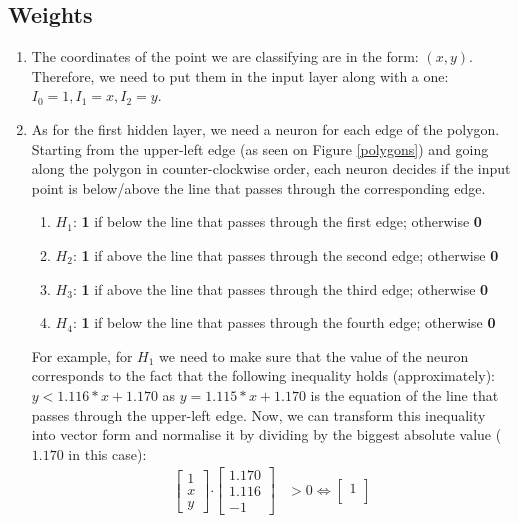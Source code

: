 \documentclass[12pt]{article}
\begin{document}
\subsection*{Weights}
\begin{enumerate}
\item The coordinates of the point we are classifying are in the form: $(x,y)$. Therefore, we need to put them in the input layer along with a one: $I_0=1, I_1=x, I_2 = y$.
\item As for the first hidden layer, we need a neuron for each edge of the polygon. Starting from the upper-left edge (as seen on Figure \ref{polygons}) and going along the polygon in counter-clockwise order, each neuron decides if the input point is below/above the line that passes through the corresponding edge.
\begin{enumerate}
\item \underline{$H_1$}: \textbf{1} if below the line that passes through the first edge; otherwise
\textbf{0}
\item \underline{$H_2$}: \textbf{1} if above the line that passes through the second edge; otherwise \textbf{0}
\item \underline{$H_3$}: \textbf{1} if above the line that passes through the third edge; otherwise \textbf{0}
\item \underline{$H_4$}: \textbf{1} if below the line that passes through the fourth edge; otherwise \textbf{0}
\end{enumerate}
For example, for $H_1$ we need to make sure that the value of the neuron corresponds to the fact that the following inequality holds (approximately): $y < 1.116 * x + 1.170$ as $y = 1.115 * x + 1.170$ is the equation of the line that passes through the upper-left edge. Now, we can transform this inequality into vector form and normalise it by dividing by the biggest absolute value ($1.170$ in this case): 
\begin{align}
     \begin{bmatrix}
           1 \\
           x \\
           y
         \end{bmatrix} \boldsymbol{\cdot} \begin{bmatrix}
           1.170 \\
           1.116 \\
           -1
         \end{bmatrix} &> 0 \Leftrightarrow \begin{bmatrix}
           1 \\

\end{bmatrix}
\end{align}
\end{enumerate}
\end{document}
